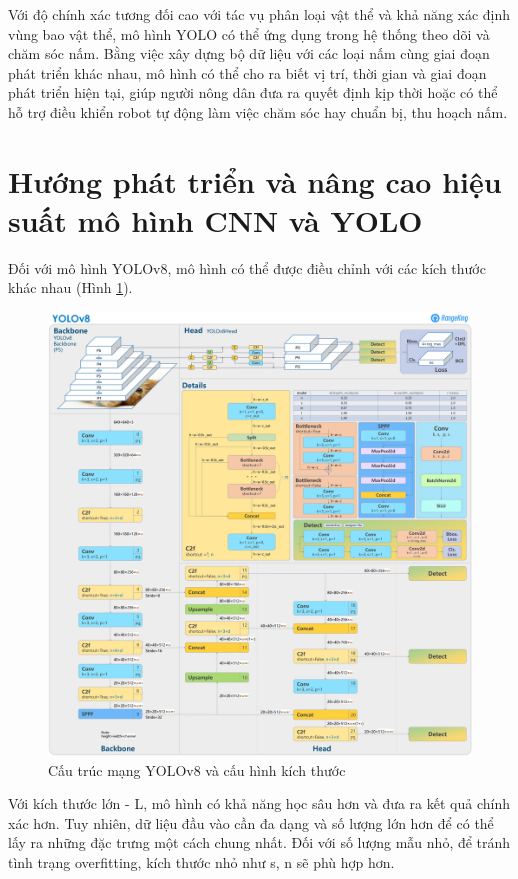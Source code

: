 Với độ chính xác tương đối cao với tác vụ phân loại vật thể và khả năng xác định vùng bao vật thể, mô hình YOLO có thể ứng dụng trong hệ thống theo dõi và chăm sóc nấm. Bằng việc xây dựng bộ dữ liệu với các loại nấm cùng giai đoạn phát triển khác nhau, mô hình có thể cho ra biết vị trí, thời gian và giai đoạn phát triển hiện tại, giúp người nông dân đưa ra quyết định kịp thời hoặc có thể hỗ trợ điều khiển robot tự động làm việc chăm sóc hay chuẩn bị,  thu hoạch nấm.

\section{Hướng phát triển và nâng cao hiệu suất mô hình CNN và YOLO}

Đối với mô hình YOLOv8, mô hình có thể được điều chỉnh với các kích thước khác nhau (Hình \ref{fig:yolov8-structure}).

\begin{figure}
    \centering
    \includegraphics[width=1\linewidth]{images/yolov8-network.png}
    \caption{Cấu trúc mạng YOLOv8 và cấu hình kích thước}
    \label{fig:yolov8-structure}
\end{figure}

Với kích thước lớn - L, mô hình có khả năng học sâu hơn và đưa ra kết quả chính xác hơn. Tuy nhiên, dữ liệu đầu vào cần đa dạng và số lượng lớn hơn để có thể lấy ra những đặc trưng một cách chung nhất. Đối với số lượng mẫu nhỏ, để tránh tình trạng overfitting, kích thước nhỏ như s, n sẽ phù hợp hơn.

